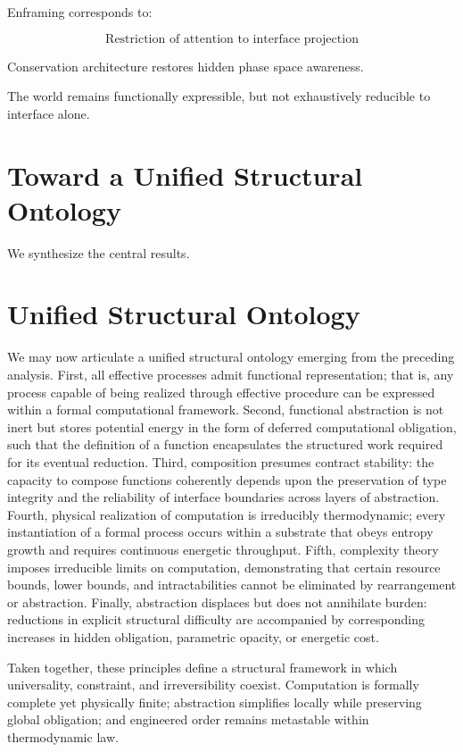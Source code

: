 \documentclass[11pt,openany]{book}
\begin{document}
Enframing corresponds to:

\[
\text{Restriction of attention to interface projection}
\]

Conservation architecture restores hidden phase space awareness.

The world remains functionally expressible,
but not exhaustively reducible to interface alone.

\section{Toward a Unified Structural Ontology}

We synthesize the central results.

\medskip

\section*{Unified Structural Ontology}

We may now articulate a unified structural ontology emerging from the preceding analysis. 
First, all effective processes admit functional representation; that is, any process 
capable of being realized through effective procedure can be expressed within a 
formal computational framework. Second, functional abstraction is not inert but 
stores potential energy in the form of deferred computational obligation, such that 
the definition of a function encapsulates the structured work required for its 
eventual reduction. Third, composition presumes contract stability: the capacity to 
compose functions coherently depends upon the preservation of type integrity and 
the reliability of interface boundaries across layers of abstraction. Fourth, 
physical realization of computation is irreducibly thermodynamic; every instantiation 
of a formal process occurs within a substrate that obeys entropy growth and requires 
continuous energetic throughput. Fifth, complexity theory imposes irreducible limits 
on computation, demonstrating that certain resource bounds, lower bounds, and 
intractabilities cannot be eliminated by rearrangement or abstraction. Finally, 
abstraction displaces but does not annihilate burden: reductions in explicit structural 
difficulty are accompanied by corresponding increases in hidden obligation, 
parametric opacity, or energetic cost. 

Taken together, these principles define a structural framework in which universality, 
constraint, and irreversibility coexist. Computation is formally complete yet 
physically finite; abstraction simplifies locally while preserving global obligation; 
and engineered order remains metastable within thermodynamic law.
\end{document}
